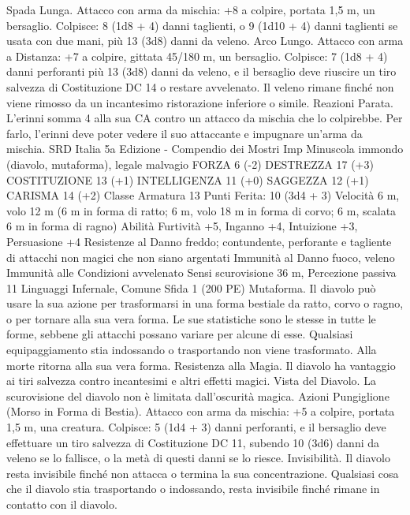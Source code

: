 \begin{multicols}{2}
Spada Lunga. Attacco con arma da mischia: +8 a colpire,
portata 1,5 m, un bersaglio.
Colpisce: 8 (1d8 + 4) danni taglienti, o 9 (1d10 + 4) danni
taglienti se usata con due mani, più 13 (3d8) danni da veleno.
Arco Lungo. Attacco con arma a Distanza: +7 a colpire, gittata
45/180 m, un bersaglio.
Colpisce: 7 (1d8 + 4) danni perforanti più 13 (3d8) danni da
veleno, e il bersaglio deve riuscire un tiro salvezza di
Costituzione DC 14 o restare avvelenato. Il veleno rimane finché
non viene rimosso da un incantesimo ristorazione inferiore o
simile.
Reazioni
Parata. L’erinni somma 4 alla sua CA contro un attacco da
mischia che lo colpirebbe. Per farlo, l’erinni deve poter vedere il
suo attaccante e impugnare un’arma da mischia.
SRD Italia 5a Edizione - Compendio dei Mostri
Imp
Minuscola immondo (diavolo, mutaforma), legale malvagio
FORZA 6 (-2)
DESTREZZA 17 (+3)
COSTITUZIONE 13 (+1)
INTELLIGENZA 11 (+0)
SAGGEZZA 12 (+1)
CARISMA 14 (+2)
Classe Armatura 13
\hspace*{0pt}\hfill{Punti Ferita}: 10 (3d4 + 3)
Velocità 6 m, volo 12 m (6 m in forma di ratto; 6 m, volo 18 m
in forma di corvo; 6 m, scalata 6 m in forma di ragno)
Abilità Furtività +5, Inganno +4, Intuizione +3, Persuasione +4
Resistenze al Danno freddo; contundente, perforante e tagliente
di attacchi non magici che non siano argentati
Immunità al Danno fuoco, veleno
Immunità alle Condizioni avvelenato
Sensi scurovisione 36 m, Percezione passiva 11
Linguaggi Infernale, Comune
Sfida 1 (200 PE)
Mutaforma. Il diavolo può usare la sua azione per trasformarsi
in una forma bestiale da ratto, corvo o ragno, o per tornare alla
sua vera forma. Le sue statistiche sono le stesse in tutte le forme,
sebbene gli attacchi possano variare per alcune di esse. Qualsiasi
equipaggiamento stia indossando o trasportando non viene
trasformato. Alla morte ritorna alla sua vera forma.
Resistenza alla Magia. Il diavolo ha vantaggio ai tiri salvezza
contro incantesimi e altri effetti magici.
Vista del Diavolo. La scurovisione del diavolo non è limitata
dall’oscurità magica.
Azioni
Pungiglione (Morso in Forma di Bestia). Attacco con arma da
mischia: +5 a colpire, portata 1,5 m, una creatura.
Colpisce: 5 (1d4 + 3) danni perforanti, e il bersaglio deve
effettuare un tiro salvezza di Costituzione DC 11, subendo 10
(3d6) danni da veleno se lo fallisce, o la metà di questi danni se
lo riesce.
Invisibilità. Il diavolo resta invisibile finché non attacca o
termina la sua concentrazione. Qualsiasi cosa che il diavolo stia
trasportando o indossando, resta invisibile finché rimane in
contatto con il diavolo.

\end{multicols}

